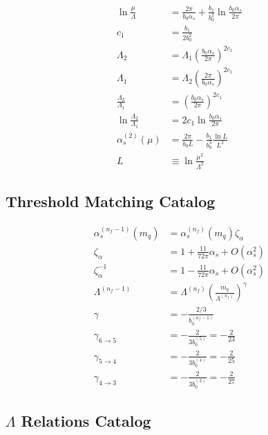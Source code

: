 \documentclass[11pt,a4paper]{article}
\theoremstyle{definition}
\begin{document}
\begin{align}
\label{eq:ext-25}
\ln\frac{\mu}{\Lambda} &= \frac{2\pi}{b_0\alpha_s} + \frac{b_1}{b_0^2}\ln\frac{b_0\alpha_s}{2\pi} \\
\label{eq:ext-26}
c_1 &= \frac{b_1}{2b_0^2} \\
\label{eq:ext-27}
\Lambda_2 &= \Lambda_1\left(\frac{b_0\alpha_s}{2\pi}\right)^{2c_1} \\
\label{eq:ext-28}
\Lambda_1 &= \Lambda_2\left(\frac{2\pi}{b_0\alpha_s}\right)^{2c_1} \\
\label{eq:ext-29}
\frac{\Lambda_2}{\Lambda_1} &= \left(\frac{b_0\alpha_s}{2\pi}\right)^{2c_1} \\
\label{eq:ext-30}
\ln\frac{\Lambda_2}{\Lambda_1} &= 2c_1\ln\frac{b_0\alpha_s}{2\pi} \\
\label{eq:ext-31}
\alpha_s^{(2)}(\mu) &= \frac{2\pi}{b_0 L} - \frac{b_1}{b_0^3}\frac{\ln L}{L^2} \\
\label{eq:ext-32}
L &\equiv \ln\frac{\mu^2}{\Lambda^2}
\end{align}

\subsection{Threshold Matching Catalog}
\label{subsec:ext-threshold}

\begin{align}
\label{eq:ext-33}
\alpha_s^{(n_f-1)}(m_q) &= \alpha_s^{(n_f)}(m_q)\zeta_\alpha \\
\label{eq:ext-34}
\zeta_\alpha &= 1 + \frac{11}{72\pi}\alpha_s + O(\alpha_s^2) \\
\label{eq:ext-35}
\zeta_\alpha^{-1} &= 1 - \frac{11}{72\pi}\alpha_s + O(\alpha_s^2) \\
\label{eq:ext-36}
\Lambda^{(n_f-1)} &= \Lambda^{(n_f)}\left(\frac{m_q}{\Lambda^{(n_f)}}\right)^{\gamma} \\
\label{eq:ext-37}
\gamma &= -\frac{2/3}{b_0^{(n_f-1)}} \\
\label{eq:ext-38}
\gamma_{6\to5} &= -\frac{2}{3b_0^{(5)}} = -\frac{2}{23} \\
\label{eq:ext-39}
\gamma_{5\to4} &= -\frac{2}{3b_0^{(4)}} = -\frac{2}{25} \\
\label{eq:ext-40}
\gamma_{4\to3} &= -\frac{2}{3b_0^{(3)}} = -\frac{2}{27}
\end{align}

\subsection{$\Lambda$ Relations Catalog}
\label{subsec:ext-lambda}
\end{document}
